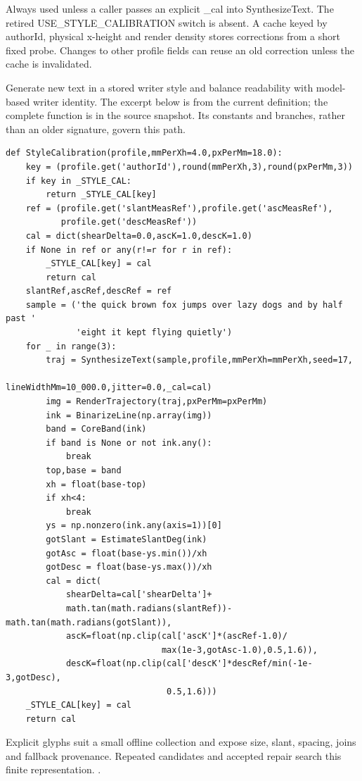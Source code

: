 Always used unless a caller passes an explicit \_cal into SynthesizeText. The retired USE\_STYLE\_CALIBRATION switch is absent. A cache keyed by authorId, physical x-height and render density stores corrections from a short fixed probe. Changes to other profile fields can reuse an old correction unless the cache is invalidated.


Generate new text in a stored writer style and balance readability with model-based writer identity. The excerpt below is from the current definition; the complete function is in the source snapshot. Its constants and branches, rather than an older signature, govern this path.


\begin{lstlisting}[style=plain]
def StyleCalibration(profile,mmPerXh=4.0,pxPerMm=18.0):
    key = (profile.get('authorId'),round(mmPerXh,3),round(pxPerMm,3))
    if key in _STYLE_CAL:
        return _STYLE_CAL[key]
    ref = (profile.get('slantMeasRef'),profile.get('ascMeasRef'),
           profile.get('descMeasRef'))
    cal = dict(shearDelta=0.0,ascK=1.0,descK=1.0)
    if None in ref or any(r!=r for r in ref):
        _STYLE_CAL[key] = cal
        return cal
    slantRef,ascRef,descRef = ref
    sample = ('the quick brown fox jumps over lazy dogs and by half past '
              'eight it kept flying quietly')
    for _ in range(3):
        traj = SynthesizeText(sample,profile,mmPerXh=mmPerXh,seed=17,
                              lineWidthMm=10_000.0,jitter=0.0,_cal=cal)
        img = RenderTrajectory(traj,pxPerMm=pxPerMm)
        ink = BinarizeLine(np.array(img))
        band = CoreBand(ink)
        if band is None or not ink.any():
            break
        top,base = band
        xh = float(base-top)
        if xh<4:
            break
        ys = np.nonzero(ink.any(axis=1))[0]
        gotSlant = EstimateSlantDeg(ink)
        gotAsc = float(base-ys.min())/xh
        gotDesc = float(base-ys.max())/xh
        cal = dict(
            shearDelta=cal['shearDelta']+
            math.tan(math.radians(slantRef))-math.tan(math.radians(gotSlant)),
            ascK=float(np.clip(cal['ascK']*(ascRef-1.0)/
                               max(1e-3,gotAsc-1.0),0.5,1.6)),
            descK=float(np.clip(cal['descK']*descRef/min(-1e-3,gotDesc),
                                0.5,1.6)))
    _STYLE_CAL[key] = cal
    return cal
\end{lstlisting}
Explicit glyphs suit a small offline collection and expose size, slant, spacing, joins and fallback provenance. Repeated candidates and accepted repair search this finite representation. \cite{haines2016,gravesgenerate,ganwriting,onedm}.



